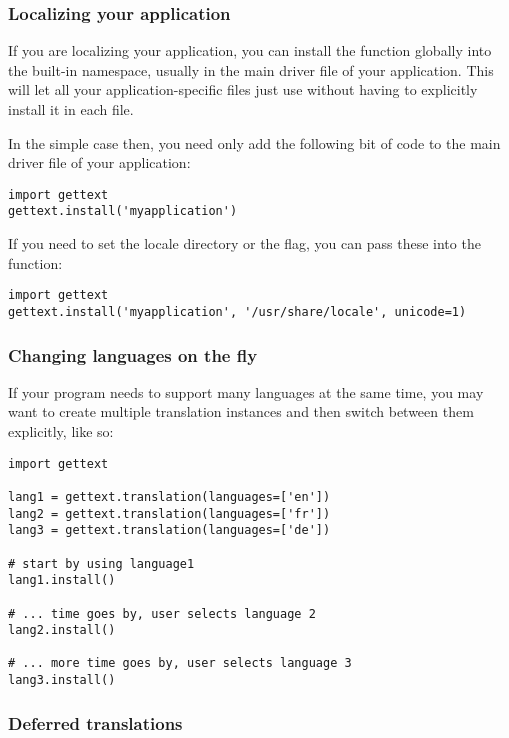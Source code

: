 \subsubsection{Localizing your application}

If you are localizing your application, you can install the \function{_()}
function globally into the built-in namespace, usually in the main driver file
of your application.  This will let all your application-specific
files just use  without having to explicitly install it in
each file.

In the simple case then, you need only add the following bit of code
to the main driver file of your application:

\begin{verbatim}
import gettext
gettext.install('myapplication')
\end{verbatim}

If you need to set the locale directory or the  flag,
you can pass these into the  function:

\begin{verbatim}
import gettext
gettext.install('myapplication', '/usr/share/locale', unicode=1)
\end{verbatim}

\subsubsection{Changing languages on the fly}

If your program needs to support many languages at the same time, you
may want to create multiple translation instances and then switch
between them explicitly, like so:

\begin{verbatim}
import gettext

lang1 = gettext.translation(languages=['en'])
lang2 = gettext.translation(languages=['fr'])
lang3 = gettext.translation(languages=['de'])

# start by using language1
lang1.install()

# ... time goes by, user selects language 2
lang2.install()

# ... more time goes by, user selects language 3
lang3.install()
\end{verbatim}

\subsubsection{Deferred translations}

